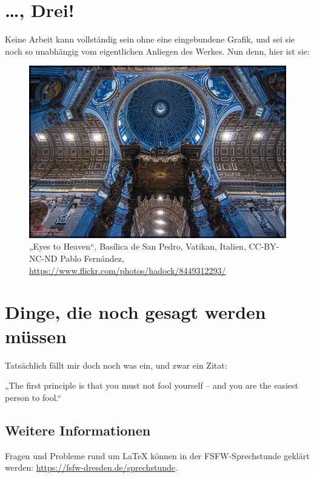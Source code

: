 \documentclass{scrbook}
\begin{document}
\chapter{\dots, Drei!}
\label{cha:drei}

Keine Arbeit kann vollständig sein ohne eine eingebundene Grafik, und sei sie
noch so unabhängig vom eigentlichen Anliegen des Werkes.  Nun denn, hier ist
sie:

\begin{figure}[h]
  \centering
  \includegraphics[width=\linewidth]{eyes-to-heaven.jpg}
  \caption{„Eyes to Heaven“, Basílica de San Pedro, Vatikan, Italien,
    CC-BY-NC-ND Pablo Fernández,
    \url{https://www.flickr.com/photos/hadock/8449312293/} }
  \label{fig:basilica-de-san-pedro}
\end{figure}

\appendix

\chapter{Dinge, die noch gesagt werden müssen}
\label{cha:dinge-die-noch}

Tatsächlich fällt mir doch noch was ein, und zwar ein Zitat:

\begin{displayquote}
  „The first principle is that you must not fool yourself – and you are the
  easiest person to fool.“
\end{displayquote}

\section{Weitere Informationen}
Fragen und Probleme rund um LaTeX können in der FSFW-Sprechstunde geklärt werden: 
\url{https://fsfw-dresden.de/sprechstunde}.
\end{document}
